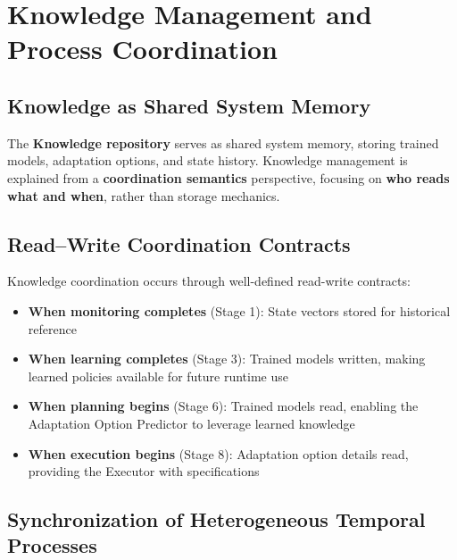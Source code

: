 \documentclass[11pt,a4paper]{article}
\begin{document}

\section{Knowledge Management and Process Coordination}
\label{sec:knowledge}

\subsection{Knowledge as Shared System Memory}
\label{subsec:shared-memory}

The \textbf{Knowledge repository} serves as shared system memory, storing trained models, adaptation options, and state history. Knowledge management is explained from a \textbf{coordination semantics} perspective, focusing on \textbf{who reads what and when}, rather than storage mechanics.

\subsection{Read--Write Coordination Contracts}
\label{subsec:coordination-contracts}

Knowledge coordination occurs through well-defined read-write contracts:

\begin{itemize}
    \item \textbf{When monitoring completes} (Stage 1): State vectors stored for historical reference
    \item \textbf{When learning completes} (Stage 3): Trained models written, making learned policies available for future runtime use
    \item \textbf{When planning begins} (Stage 6): Trained models read, enabling the Adaptation Option Predictor to leverage learned knowledge
    \item \textbf{When execution begins} (Stage 8): Adaptation option details read, providing the Executor with specifications
\end{itemize}

\subsection{Synchronization of Heterogeneous Temporal Processes}
\label{subsec:synchronization}
\end{document}
